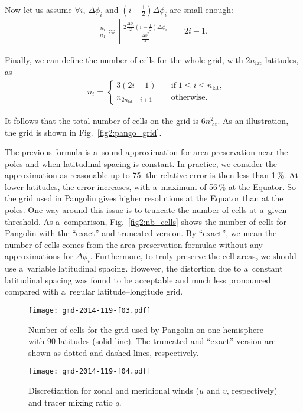    Now let us assume $\forall i$, $\Delta\phi_i$ and
   $(i-\frac{1}{2})\Delta\phi_i$ are small enough:
\begin{align*} \frac{n_i}{n_1} \approx
\left\lfloor \frac{2  \frac{\Delta\phi_i}{2}  \left(i-\frac{1}{2}\right) \Delta\phi_i}%
{ \frac{\Delta\phi_1^2}{2}} \right\rfloor
= 2i-1.
   \end{align*}

   Finally, we can define the number of cells for the whole grid, with
   $2n_{\text{lat}}$ latitudes, as
\begin{align}
&n_i =
    \begin{cases}
      3(2i-1) & \quad \text{if} \; 1 \le i \le n_{\text{lat}}, \\
      n_{2n_\mathrm{lat}-i+1} & \quad \text{otherwise.}
    \end{cases}
    \label{eqn:nb_cells2}
   \end{align}

   It follows that the total number of cells on the grid is
   $6n_{\text{lat}}^2$. As an illustration, the grid is shown in
   Fig.~\ref{fig2:pango_grid}.




   The previous formula is a~sound approximation for area preservation near the
   poles and when latitudinal spacing is constant.  In practice, we consider the
   approximation as reasonable up to 75\degree: the relative error is
   then less than 1\,\%. At lower latitudes, the error
   increases, with a~maximum of 56\,\% at the Equator. So the
   grid used in Pangolin gives higher resolutions at the Equator than
   at the poles.  One way around this issue is to truncate the number
   of cells at a~given threshold.  As a~comparison,
   Fig.~\ref{fig2:nb_cells} shows the number of cells for Pangolin with
   the ``exact'' and truncated version. By ``exact'', we mean the number
   of cells comes from the area-preservation formulae without any
   approximations for $\Delta\phi_i$.  Furthermore, to truly preserve
   the cell areas, we should use a~variable latitudinal spacing.
   However, the distortion due to a~constant latitudinal spacing was
   found to be acceptable and much less pronounced compared with
   a~regular latitude--longitude grid.

\begin{figure}
  \begin{minipage}[t]{0.48\linewidth}
\texttt{[image: gmd-2014-119-f03.pdf]}
    \caption{Number of cells for the grid used by Pangolin on one hemisphere with
      90 latitudes (solid line). The truncated and ``exact'' version are shown as
    dotted and dashed lines, respectively.}
    \label{fig2:nb_cells}%
  \end{minipage}
  \hfill
  \begin{minipage}[t]{0.48\linewidth}
    \texttt{[image: gmd-2014-119-f04.pdf]}
    \caption{Discretization for zonal and meridional winds ($u$ and $v$, respectively) and tracer
    mixing ratio $q$.}
    \label{fig2:discret}%
  \end{minipage}%
\end{figure}



